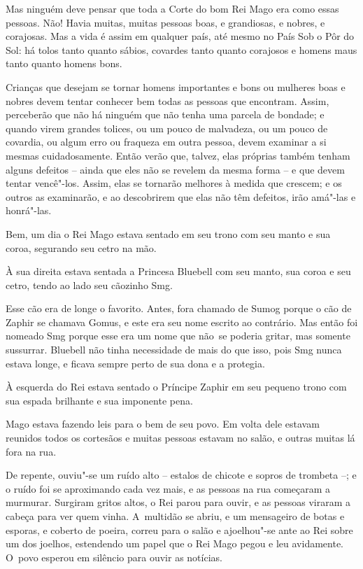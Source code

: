 Mas ninguém deve pensar que toda a Corte do bom Rei Mago era como essas
pessoas. Não! Havia muitas, muitas pessoas boas, e grandiosas, e nobres,
e corajosas. Mas a vida é assim em qualquer país, até mesmo no País Sob
o Pôr do Sol: há tolos tanto quanto sábios, covardes tanto quanto
corajosos e homens maus tanto quanto homens bons.

Crianças que desejam se tornar homens importantes e bons ou mulheres
boas e nobres devem tentar conhecer bem todas as pessoas que encontram.
Assim, perceberão que não há ninguém que não tenha uma parcela de
bondade; e quando virem grandes tolices, ou um pouco de malvadeza, ou um
pouco de covardia, ou algum erro ou fraqueza em outra pessoa, devem
examinar a si mesmas cuidadosamente. Então verão que, talvez, elas
próprias também tenham alguns defeitos -- ainda que eles não se revelem da
mesma forma -- e que devem tentar vencê"-los. Assim, elas se
tornarão melhores à medida que crescem; e os outros as examinarão, e ao
descobrirem que elas não têm defeitos, irão amá"-las e honrá"-las.

Bem, um dia o Rei Mago estava sentado em seu trono com seu manto e sua
coroa, segurando seu cetro na mão.

À sua direita estava sentada a Princesa Bluebell com seu manto, sua coroa e seu
cetro, tendo ao lado seu cãozinho Smg.

Esse cão era de longe o favorito. Antes, fora chamado de Sumog
porque o cão de Zaphir se chamava Gomus, e este era seu nome escrito ao
contrário. Mas então foi nomeado Smg porque esse era um nome que não~se
poderia gritar, mas somente sussurrar. Bluebell não tinha necessidade de
mais do que isso, pois Smg nunca estava longe, e ficava sempre perto de
sua dona e a protegia.

À esquerda do Rei estava sentado o Príncipe Zaphir em seu pequeno trono
com sua espada brilhante e sua imponente pena.

Mago estava fazendo leis para o bem de seu povo. Em volta dele estavam
reunidos todos os cortesãos e muitas pessoas estavam no salão, e outras
muitas lá fora na rua.

De repente, ouviu"-se um ruído alto -- estalos de chicote e sopros de
trombeta --; e o ruído foi se aproximando cada vez mais, e as pessoas na
rua começaram a murmurar. Surgiram gritos altos, o Rei parou para ouvir,
e as pessoas viraram a cabeça para ver quem vinha. A~multidão se abriu,
e um mensageiro de botas e esporas, e coberto de poeira, correu para o
salão e ajoelhou"-se ante ao Rei sobre um dos joelhos, estendendo um
papel que o Rei Mago pegou e leu avidamente. O~povo esperou em silêncio
para ouvir as notícias.

